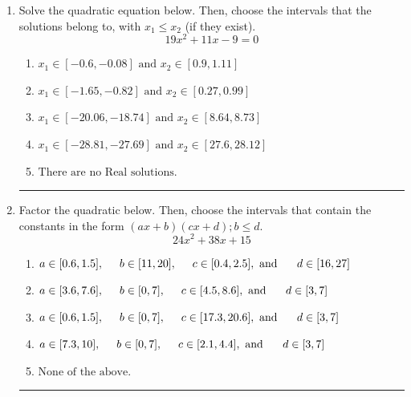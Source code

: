 \documentclass[14pt]{extbook}
\newcommand{\litem}[1]{\item#1\hspace*{-1cm}\rule{\textwidth}{0.4pt}}
\begin{document}
\begin{enumerate}
{\begin{enumerate}[label=\Alph*.]
\end{enumerate} }
\litem{
Solve the quadratic equation below. Then, choose the intervals that the solutions belong to, with $x_1 \leq x_2$ (if they exist).\[ 19x^{2} +11 x -9 = 0 \]\begin{enumerate}[label=\Alph*.]
\item \( x_1 \in [-0.6, -0.08] \text{ and } x_2 \in [0.9, 1.11] \)
\item \( x_1 \in [-1.65, -0.82] \text{ and } x_2 \in [0.27, 0.99] \)
\item \( x_1 \in [-20.06, -18.74] \text{ and } x_2 \in [8.64, 8.73] \)
\item \( x_1 \in [-28.81, -27.69] \text{ and } x_2 \in [27.6, 28.12] \)
\item \( \text{There are no Real solutions.} \)

\end{enumerate} }
\litem{
Factor the quadratic below. Then, choose the intervals that contain the constants in the form $(ax+b)(cx+d); b \leq d.$\[ 24x^{2} +38 x + 15 \]\begin{enumerate}[label=\Alph*.]
\item \( a \in [0.6, 1.5], \hspace*{5mm} b \in [11, 20], \hspace*{5mm} c \in [0.4, 2.5], \text{ and } \hspace*{5mm} d \in [16, 27] \)
\item \( a \in [3.6, 7.6], \hspace*{5mm} b \in [0, 7], \hspace*{5mm} c \in [4.5, 8.6], \text{ and } \hspace*{5mm} d \in [3, 7] \)
\item \( a \in [0.6, 1.5], \hspace*{5mm} b \in [0, 7], \hspace*{5mm} c \in [17.3, 20.6], \text{ and } \hspace*{5mm} d \in [3, 7] \)
\item \( a \in [7.3, 10], \hspace*{5mm} b \in [0, 7], \hspace*{5mm} c \in [2.1, 4.4], \text{ and } \hspace*{5mm} d \in [3, 7] \)
\item \( \text{None of the above.} \)


\end{enumerate}}
\end{enumerate}
\end{document}
